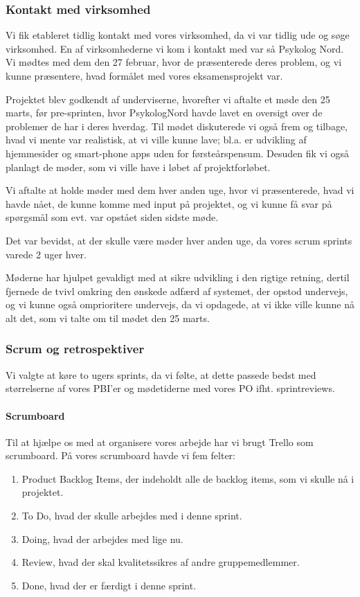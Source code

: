 \subsubsection{Kontakt med virksomhed}

Vi fik etableret tidlig kontakt med vores virksomhed, da vi var tidlig ude og søge virksomhed.
En af virksomhederne vi kom i kontakt med var så Psykolog Nord.
Vi mødtes med dem den 27 februar, hvor de præsenterede deres problem, og vi kunne præsentere, hvad formålet med vores eksamensprojekt var.

Projektet blev godkendt af underviserne, hvorefter vi aftalte et møde den 25 marts, før pre-sprinten, hvor PsykologNord havde lavet en oversigt over de problemer de har i deres hverdag.
Til mødet diskuterede vi også frem og tilbage, hvad vi mente var realistisk, at vi ville kunne lave; bl.a. er udvikling af hjemmesider og smart-phone apps uden for førsteårspensum.
Desuden fik vi også planlagt de møder, som vi ville have i løbet af projektforløbet.

Vi aftalte at holde møder med dem hver anden uge, hvor vi præsenterede, hvad vi havde nået, de kunne komme med input på projektet, og vi kunne få svar på spørgsmål som evt. var opstået siden sidste møde.

Det var bevidst, at der skulle være møder hver anden uge, da vores scrum sprints varede 2 uger hver.

Møderne har hjulpet gevaldigt med at sikre udvikling i den rigtige retning, dertil fjernede de tvivl omkring den ønskede adfærd af systemet, der opstod undervejs, og vi kunne også omprioritere undervejs, da vi opdagede, at vi ikke ville kunne nå alt det, som vi talte om til mødet den 25 marts.



\subsubsection{Scrum og retrospektiver}

Vi valgte at køre to ugers sprints, da vi følte, at dette passede bedst med størrelserne af vores PBI'er og mødetiderne med vores PO ifht. sprintreviews.

\paragraph*{Scrumboard}
Til at hjælpe os med at organisere vores arbejde har vi brugt Trello som scrumboard.
På vores scrumboard havde vi fem felter:
\begin{enumerate}
    \item Product Backlog Items, der indeholdt alle de backlog items, som vi skulle nå i projektet.
    \item To Do, hvad der skulle arbejdes med i denne sprint.
    \item Doing, hvad der arbejdes med lige nu.
    \item Review, hvad der skal kvalitetssikres af andre gruppemedlemmer.
    \item Done, hvad der er færdigt i denne sprint.
\end{enumerate}

